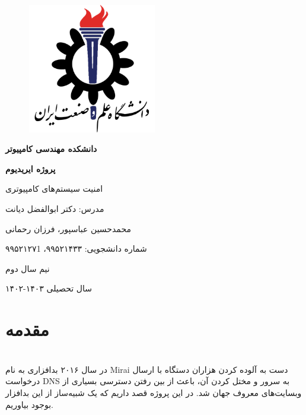 \documentclass{article}
\begin{document}
\begin{titlepage}
    \centering
    \begin{figure}[ht]
        \centering
        \includegraphics[width=0.5\textwidth]{iust.png}
    \end{figure}
    \vspace{1cm}
    {\scshape\Huge \textbf{دانشکده مهندسی کامپیوتر} \par}
    \vspace{1cm}
    {\huge\bfseries پروژه ایریدیوم  \par}
    \vspace{1cm}
    {\Large امنیت سیستم‌های کامپیوتری \par}
    \vspace{1cm}
	{\LARGE  مدرس: دکتر ابوالفضل دیانت\par}
    \vspace{1cm}
    {\LARGE  محمدحسین عباسپور، فرزان رحمانی \par}
    \vspace{1cm}
    {\LARGE شماره دانشجویی: ۹۹۵۲۱۴۳۳، ۹۹۵۲۱۲۷1 \par}
    \vspace{1.22cm}
    {\large نیم سال دوم \par}
    {\large سال تحصیلی ۱۴۰۳-۱۴۰۲ \par}
\end{titlepage}
\newpage
\doublespacing
\singlespacing
\newpage
{}
\section {مقدمه}
\leavevmode 
\\
در سال ۲۰۱۶ بدافزاری به نام Mirai دست به آلوده کردن هزاران دستگاه با ارسال درخواست DNS به سرور و مختل کردن آن، باعث از بین رفتن دسترسی بسیاری از وبسایت‌های معروف جهان شد. در این پروژه قصد داریم که یک شبیه‌ساز از این بدافزار بوجود بیاوریم.
\\
\end{document}
